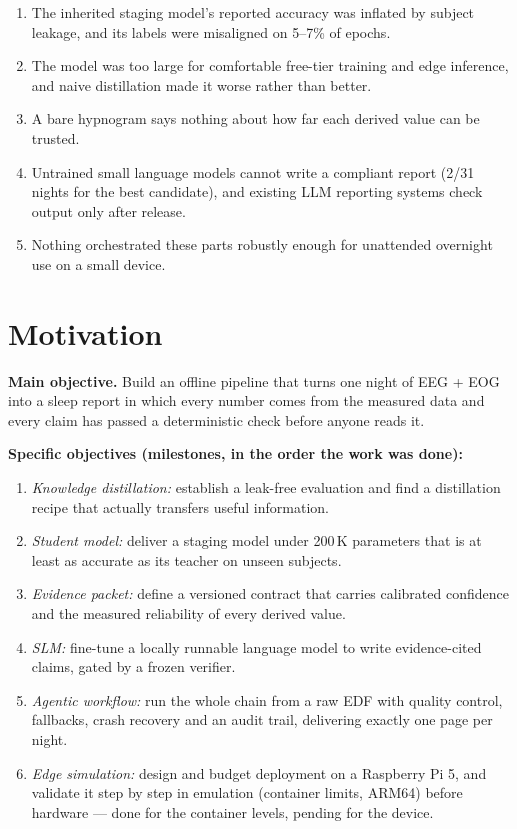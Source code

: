 \begin{enumerate}
  \item The inherited staging model's reported accuracy was inflated by subject leakage, and its labels were
  misaligned on 5--7\% of epochs.
  \item The model was too large for comfortable free-tier training and edge inference, and naive distillation made
  it worse rather than better.
  \item A bare hypnogram says nothing about how far each derived value can be trusted.
  \item Untrained small language models cannot write a compliant report (2/31 nights for the best candidate), and
  existing LLM reporting systems check output only after release.
  \item Nothing orchestrated these parts robustly enough for unattended overnight use on a small device.
\end{enumerate}

\section{Motivation}

\textbf{Main objective.} Build an offline pipeline that turns one night of EEG + EOG into a sleep report in which
every number comes from the measured data and every claim has passed a deterministic check before anyone reads it.

\textbf{Specific objectives (milestones, in the order the work was done):}
\begin{enumerate}
  \item \emph{Knowledge distillation:} establish a leak-free evaluation and find a distillation recipe that
  actually transfers useful information.
  \item \emph{Student model:} deliver a staging model under 200\,K parameters that is at least as accurate as its
  teacher on unseen subjects.
  \item \emph{Evidence packet:} define a versioned contract that carries calibrated confidence and the measured
  reliability of every derived value.
  \item \emph{SLM:} fine-tune a locally runnable language model to write evidence-cited claims, gated by a frozen
  verifier.
  \item \emph{Agentic workflow:} run the whole chain from a raw EDF with quality control, fallbacks, crash recovery
  and an audit trail, delivering exactly one page per night.
  \item \emph{Edge simulation:} design and budget deployment on a Raspberry Pi 5, and validate it step by step in
  emulation (container limits, ARM64) before hardware --- done for the container levels, pending for the device.
\end{enumerate}

